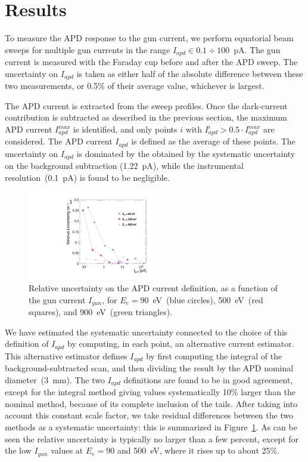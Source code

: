 \documentclass[12p]{paper}
\begin{document}
\section{Results}

To measure the APD response to the gun current, we perform equatorial beam sweeps for multiple gun currents in the range $I_{apd} \in 0.1 \div 100$~pA. The gun current is measured with the Faraday cup before and after the APD sweep. The uncertainty on $I_{apd}$ is taken as either half of the absolute difference between these two measurements, or 0.5\% of their average value, whichever is largest.

The APD current is extracted from the sweep profiles. Once the dark-current contribution is subtracted as described in the previous section, the maximum APD current $I_{apd}^{max}$ is identified, and only points $i$ with $I_{apd}^i > 0.5\cdot I_{apd}^{max}$ are considered. The APD current $I_{apd}$ is defined as the average of these points. The uncertainty on $I_{apd}$ is dominated by the obtained by the systematic uncertainty on the background subtraction (1.22~pA), while the instrumental resolution~(0.1~pA) is found to be negligible. 

\begin{figure}[htb]
  \centering
  \includegraphics[width=0.49\textwidth]{figures/allSystCurrent}
 \caption{Relative uncertainty on the APD current definition, as a function of the gun current $I_{gun}$, for $E_e = 90$~eV~(blue circles), 500~eV~(red squares), and 900~eV~(green triangles).
  \label{fig:systCurrent}}
\end{figure}


We have estimated the systematic uncertainty connected to the choice of this definition of $I_{apd}$ by computing, in each point, an alternative current estimator. This alternative estimator defines $I_{apd}$ by first computing the integral of the background-subtracted scan, and then dividing the result by the APD nominal diameter~(3~mm). The two $I_{apd}$ definitions are found to be in good agreement,  except for the integral method giving values systematically 10\% larger than the nominal method, because of its complete inclusion of the tails. After taking into account this constant scale factor, we take residual differences between the two methods as a systematic uncertainty: this is summarized in Figure~\ref{fig:systCurrent}. As can be seen the relative uncertainty is typically no larger than a few percent, except for the low $I_{gun}$ values at $E_e = 90$ and 500~eV, where it rises up to about 25\%. 
\end{document}
